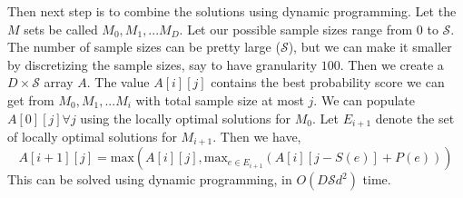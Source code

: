 Then next step is to combine the solutions using dynamic programming. Let the $M$ sets be called $M_0, M_1, ... M_D$. Let our possible sample sizes range from $0$ to $\mathcal{S}$. The number of sample sizes can be pretty large ($\mathcal{S}$), but we can make it smaller by discretizing the sample sizes, say to have granularity $100$. Then we create a $D \times \mathcal{S}$ array $A$. The value $A\left[i\right]\left[j\right]$ contains the best probability score we can get from $M_0, M_1, ... M_i$ with total sample size at most $j$. We can populate $A\left[0\right]\left[j\right] \forall j$ using the locally optimal solutions for $M_0$. Let $E_{i+1}$ denote the set of locally optimal solutions for $M_{i+1}$. Then we have,
$$A\left[i+1\right] \left[j \right] = \textrm{max} (A\left[i\right]\left[j\right], \textrm{max}_{e \in E_{i+1}}(A\left[i\right]\left[j-S(e)\right] + P(e)))$$
This can be solved using dynamic programming, in $O(D\mathcal{S}d^2)$ time. 

